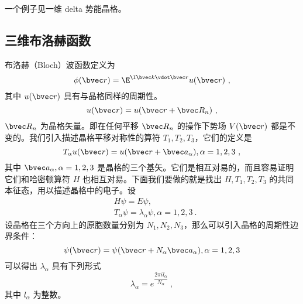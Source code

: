 一个例子见一维 delta 势能晶格。

\subsection{三维布洛赫函数}

\cite{黄昆}\cite{Bransden}布洛赫（Bloch）波函数定义为
\begin{equation}\label{eq_Bloch_3}
\phi(\bvec r) = \E^{\I \bvec k \vdot \bvec r} u(\bvec r)~,
\end{equation}
其中 $u(\bvec r)$ 具有与晶格同样的周期性。
\begin{equation}
u(\bvec r)=u(\bvec r+\bvec R_n)~,
\end{equation}
$\bvec R_n$ 为晶格矢量。即在任何平移 $\bvec R_n$ 的操作下势场 $V(\bvec r)$ 都是不变的。我们引入描述晶格平移对称性的算符 $T_1,T_2,T_3$，它们的定义是
\begin{equation}
T_\alpha u(\bvec r)= u(\bvec r+\bvec a_\alpha),\alpha=1,2,3~,
\end{equation}
其中 $\bvec a_\alpha,\alpha=1,2,3$ 是晶格的三个基矢。它们是相互对易的，而且容易证明它们和哈密顿算符 $H$ 也相互对易。下面我们要做的就是找出 $H,T_1,T_2,T_3$ 的共同本征态，用以描述晶格中的电子。设
\begin{equation}
\begin{aligned}
&H\psi=E\psi,\\
&T_\alpha \psi = \lambda_\alpha \psi, \alpha=1,2,3~.
\end{aligned}
\end{equation}
设晶格在三个方向上的原胞数量分别为 $N_1,N_2,N_3$，那么可以引入晶格的周期性边界条件：
\begin{equation}
\psi(\bvec r)=\psi(\bvec r+N_\alpha \bvec a_\alpha),\alpha=1,2,3
\end{equation}
可以得出 $\lambda_\alpha$ 具有下列形式
\begin{equation}
\lambda_\alpha=e^{ \dfrac{2\pi i l_\alpha}{N_\alpha}}~,
\end{equation}
其中 $l_\alpha$ 为整数。

